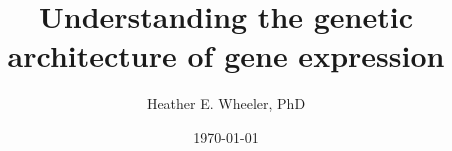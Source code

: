 
\title[hwheeler@bsd.uchicago.edu]{Understanding the genetic architecture of gene expression} %

\author{Heather E. Wheeler, PhD} %
\date{\today} %



